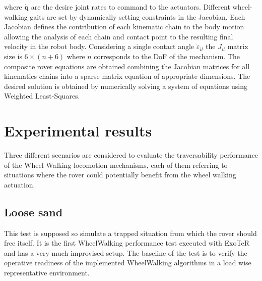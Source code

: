 \documentclass[a4paper,twocolumn]{esapub2005} %
\begin{document}
where $\boldsymbol{\dot{q}}$ are the desire joint rates to command to the
actuators.  Different wheel-walking gaits are set by dynamically setting
constraints in the Jacobian. Each Jacobian defines the contribution of each
kinematic chain to the body motion allowing the analysis of each chain and
contact point to the resulting final velocity in the robot body.  Considering a
single contact angle $\dot{\varepsilon}_{il}$ the $J_{il}$ matrix size is $6
\times (n + 6)$ where $n$ corresponds to the DoF of the mechanism.  The
composite rover equations are obtained combining the Jacobian matrices for all
kinematics chains into a sparse matrix equation of appropriate dimensions. The
desired solution is obtained by numerically solving a system of equations using
Weighted Least-Squares.



\section{Experimental results}

Three different scenarios are considered to evaluate the traversability performance of the Wheel Walking locomotion mechanisms, each of them referring to situations where the rover could potentially benefit from the wheel walking actuation.

\subsection{Loose sand}
This test is supposed so simulate a trapped situation from which the rover should free itself. It is the first WheelWalking performance test executed with ExoTeR and has a very much improvised setup. The baseline of the test is to verify the operative readiness of the implemented WheelWalking algorithms in a load wise representative environment.
\end{document}
